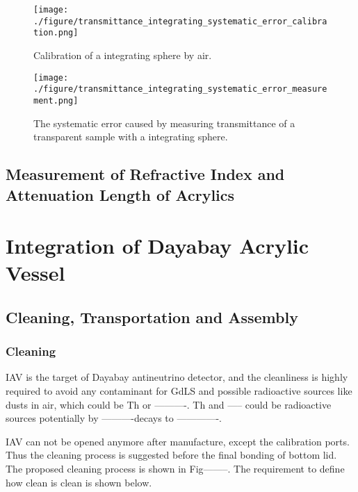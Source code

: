 \begin{figure}[h]
    \centering
    \texttt{[image: ./figure/transmittance\_integrating\_systematic\_error\_calibration.png]}
    \caption{Calibration of a integrating sphere by air.}
    \label{transmittance_integrating_systematic_error_calibration.png}
    \end{figure}




\begin{figure}[h]
    \centering
    \texttt{[image: ./figure/transmittance\_integrating\_systematic\_error\_measurement.png]}
    \caption{The systematic error caused by measuring transmittance of a transparent sample with a integrating sphere.}
    \label{transmittance_integrating_systematic_error_measurement.png}
    \end{figure}



\subsection {Measurement of Refractive Index and Attenuation Length of Acrylics}
\label {sec:RTMethod}


\section {Integration of Dayabay Acrylic Vessel}

\subsection {Cleaning, Transportation and Assembly}


\subsubsection {Cleaning}

IAV is the target of Dayabay antineutrino detector,
and the cleanliness is highly required to avoid any contaminant
for GdLS and possible radioactive sources like dusts in air, which
could be Th or ----------. Th and ----- could be radioactive sources potentially
by ----------decays to -------------.

IAV can not be opened anymore after manufacture, except the calibration ports.
Thus the cleaning process is suggested before the final bonding of bottom lid.
The proposed cleaning process is shown in Fig--------. The requirement to define
how clean is clean is shown below.


